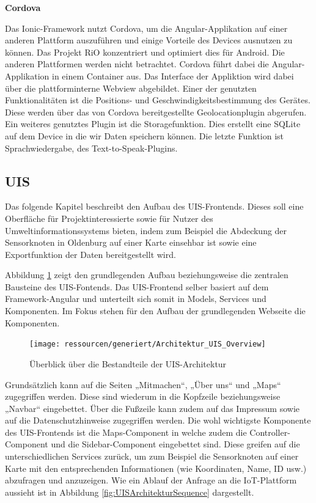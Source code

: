 \textbf{Cordova}

Das Ionic-Framework nutzt Cordova, um die Angular-Applikation auf einer anderen Plattform auszuführen und einige Vorteile des Devices ausnutzen zu können. 
Das Projekt RiO konzentriert und optimiert dies für Android. 
Die anderen Plattformen werden nicht betrachtet. 
Cordova führt dabei die Angular-Applikation in einem Container aus. 
Das Interface der Appliktion wird dabei über die plattforminterne Webview abgebildet. 
Einer der genutzten Funktionalitäten ist die Positions- und Geschwindigkeitsbestimmung des Gerätes. 
Diese werden über das von Cordova bereitgestellte Geolocationplugin abgerufen. 
Ein weiteres genutztes Plugin ist die Storagefunktion. 
Dies erstellt eine SQLite auf dem Device in die wir Daten speichern können. 
Die letzte Funktion ist Sprachwiedergabe, des Text-to-Speak-Plugins.

\subsection{UIS}
Das folgende Kapitel beschreibt den Aufbau des UIS-Frontends. 
Dieses soll eine Oberfläche für Projektinteressierte sowie für Nutzer des Umweltinformationssystems bieten, indem zum Beispiel die Abdeckung der Sensorknoten in Oldenburg auf einer Karte einsehbar ist sowie eine Exportfunktion der Daten bereitgestellt wird. 


Abbildung \ref{fig:UISArchitekturOverview} zeigt den grundlegenden Aufbau beziehungsweise die zentralen Bausteine des UIS-Fontends.
Das UIS-Frontend selber basiert auf dem Framework-Angular und unterteilt sich somit in Models, Services und Komponenten. Im Fokus stehen für den Aufbau der grundlegenden Webseite die Komponenten. 


\begin{figure}[!htb]
	\centering
	\texttt{[image: ressourcen/generiert/Architektur\_UIS\_Overview]}
	\caption{Überblick über die Bestandteile der UIS-Architektur}
	\label{fig:UISArchitekturOverview}
\end{figure}


 
Grundsätzlich kann auf die Seiten „Mitmachen“, „Über uns“ und  „Maps“ zugegriffen werden. Diese sind wiederum in die Kopfzeile beziehungsweise „Navbar“ eingebettet. 
Über die Fußzeile kann zudem auf das Impressum sowie auf die Datenschutzhinweise zugegriffen werden. 
Die wohl wichtigste Komponente des UIS-Frontends ist die Maps-Component in welche zudem die Controller-Component und die Sidebar-Component eingebettet sind. 
Diese greifen auf die unterschiedlichen Services zurück, um zum Beispiel die Sensorknoten auf einer Karte mit den entsprechenden Informationen (wie Koordinaten, Name, ID usw.) abzufragen und anzuzeigen. 
Wie ein Ablauf der Anfrage an die IoT-Plattform aussieht ist in Abbildung \ref{fig:UISArchitekturSequence} dargestellt. 

